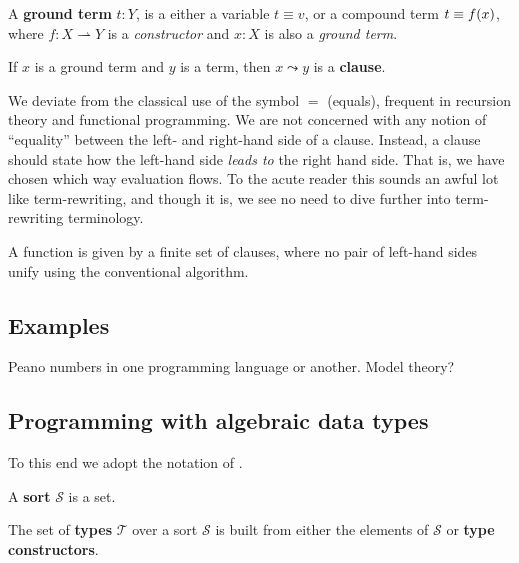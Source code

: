 \begin{definition} A \textbf{ground term} $t : Y$, is a either a variable $t
\equiv v$, or a compound term $t \equiv f{\mathopen{}\left({x}\right)\mathclose{}}$, where $f : X \rightharpoonup
Y$ is a \emph{constructor} and $x : X$ is also a \emph{ground term}.
\end{definition}

\begin{definition} If $x$ is a ground term and $y$ is a term, then $x \leadsto
y$ is a \textbf{clause}.  \end{definition}

\begin{remark} We deviate from the classical use of the symbol $=$ (equals),
frequent in recursion theory and functional programming. We are not concerned
with any notion of ``equality'' between the left- and right-hand side of a
clause. Instead, a clause should state how the left-hand side \emph{leads to}
the right hand side. That is, we have chosen which way evaluation flows. To the
acute reader this sounds an awful lot like term-rewriting, and though it is, we
see no need to dive further into term-rewriting terminology. \end{remark}

\begin{definition} A function is given by a finite set of clauses, where no
pair of left-hand sides unify using the conventional algorithm.
\end{definition}

\subsection{Examples}

\begin{example} Peano numbers in one programming language or another. Model
theory? \end{example}

\subsection{Programming with algebraic data types}

To this end we adopt the notation of \cite{marion-2003}.

\begin{definition} A \textbf{sort} $\mathcal{S}$ is a set. \end{definition}

\begin{specification} The set of \textbf{types} $\mathcal{T}$ over a sort
$\mathcal{S}$ is  built from either the elements of $\mathcal{S}$ or
\textbf{type constructors}. \end{specification}

